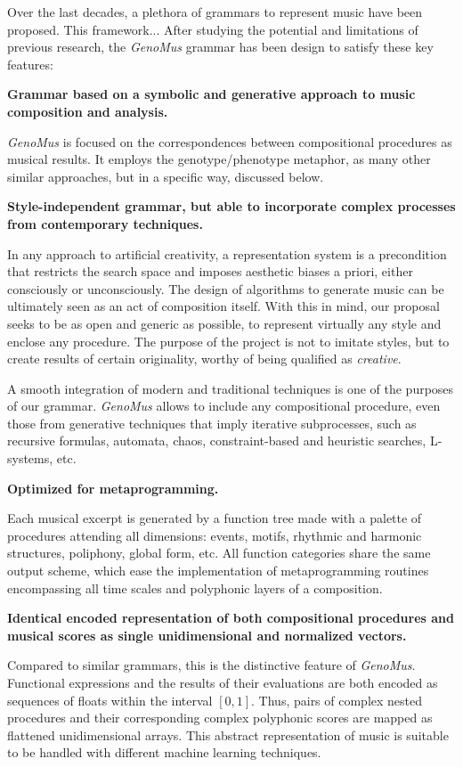 \documentclass{article}
\begin{document}
Over the last decades, a plethora of grammars to represent music have been proposed. This framework...  After studying the potential and limitations of previous research, the \textsl{GenoMus} grammar has been design to satisfy these key features:

\textbf{Grammar based on a symbolic and generative approach to music composition and analysis.}

\textsl{GenoMus} is focused on the correspondences between compositional procedures as musical results. It employs the genotype/phenotype metaphor, as many other similar approaches, but in a specific way, discussed below.

\textbf{Style-independent grammar, but able to incorporate complex processes from contemporary techniques.} 

In any approach to artificial creativity, a representation system is a precondition that restricts the search space and imposes aesthetic biases a priori, either consciously or unconsciously. The design of algorithms to generate music can be ultimately seen as an act of composition itself. With this in mind, our proposal seeks to be as open and generic as possible, to represent virtually any style and enclose any procedure. The purpose of the project is not to imitate styles, but to create results of certain originality, worthy of being qualified as \emph{creative}. 

A smooth integration of modern and traditional techniques is one of the purposes of our grammar. \textsl{GenoMus} allows to include any compositional procedure, even those from generative techniques that imply iterative subprocesses, such as recursive formulas, automata, chaos, constraint-based and heuristic searches, L-systems, etc. 

\textbf{Optimized for metaprogramming.}

Each musical excerpt is generated by a function tree made with a palette of procedures attending all dimensions: events, motifs, rhythmic and harmonic structures, poliphony, global form, etc. All function categories share the same output scheme, which ease the implementation of metaprogramming routines encompassing all time scales and polyphonic layers of a composition.

\textbf{Identical encoded representation of both compositional procedures and musical scores as single unidimensional and normalized vectors.}

Compared to similar grammars, this is the distinctive feature of \textsl{GenoMus}. Functional expressions and the results of their evaluations are both encoded as sequences of floats within the interval $[0, 1]$. Thus, pairs of complex nested procedures and their corresponding complex polyphonic scores are mapped as flattened unidimensional arrays. This abstract representation of music is suitable to be handled with different machine learning techniques. 
\end{document}
